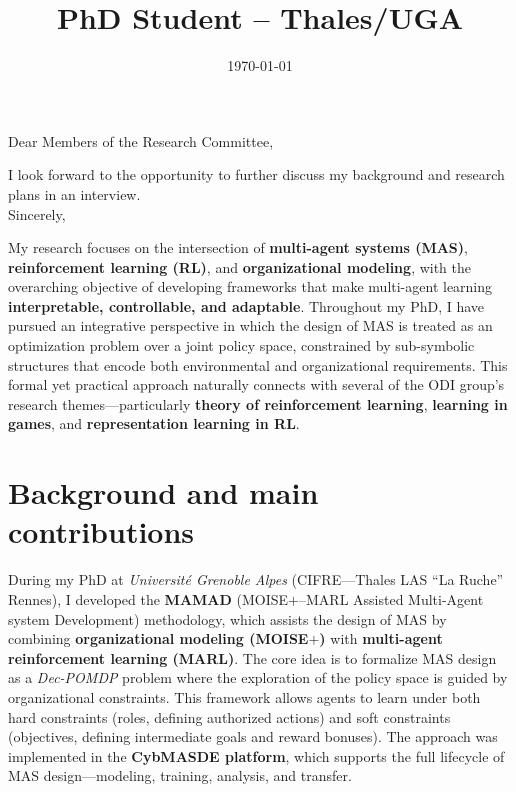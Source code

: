 \documentclass[11pt,a4paper,sans]{moderncv}
\title{PhD Student -- Thales/UGA}
\begin{document}
\date{\today}
\opening{Dear Members of the Research Committee,}
\closing{{I look forward to the opportunity to further discuss my background and research plans in an interview.}\\[0.6cm]Sincerely,\vspace{-0.6cm}}

\makelettertitle

\justifying

\noindent
My research focuses on the intersection of \textbf{multi-agent systems (MAS)}, \textbf{reinforcement learning (RL)}, and \textbf{organizational modeling}, with the overarching objective of developing frameworks that make multi-agent learning \textbf{interpretable, controllable, and adaptable}.
Throughout my PhD, I have pursued an integrative perspective in which the design of MAS is treated as an optimization problem over a joint policy space, constrained by sub-symbolic structures that encode both environmental and organizational requirements.
This formal yet practical approach naturally connects with several of the ODI group's research themes—particularly \textbf{theory of reinforcement learning}, \textbf{learning in games}, and \textbf{representation learning in RL}.

\section*{Background and main contributions}

During my PhD at \emph{Université Grenoble Alpes} (CIFRE—Thales LAS “La Ruche” Rennes), I developed the \textbf{MAMAD} (MOISE$+$–MARL Assisted Multi-Agent system Development) methodology, which assists the design of MAS by combining \textbf{organizational modeling (MOISE$+$)} with \textbf{multi-agent reinforcement learning (MARL)}.
The core idea is to formalize MAS design as a \emph{Dec-POMDP} problem where the exploration of the policy space is guided by organizational constraints.
This framework allows agents to learn under both hard constraints (roles, defining authorized actions) and soft constraints (objectives, defining intermediate goals and reward bonuses).
The approach was implemented in the \textbf{CybMASDE platform}, which supports the full lifecycle of MAS design—modeling, training, analysis, and transfer.
\end{document}
